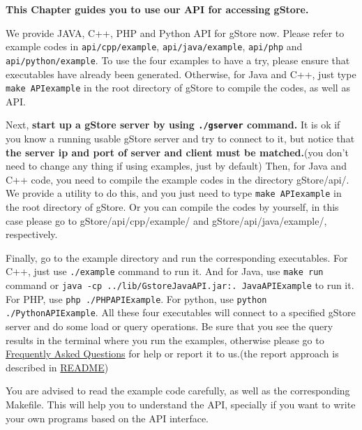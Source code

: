 \documentclass[titlepage, a4paper, 12pt]{article}
\begin{document}
\textbf{This Chapter guides you to use our API for accessing gStore.}


We provide JAVA, C++, PHP and Python API for gStore now. Please refer to example
codes in \texttt{api/cpp/example}, \texttt{api/java/example}, \texttt{api/php} and \texttt{api/python/example}. To use the four examples to have a try, please ensure that executables have already been generated. Otherwise, for Java and C++, just type \texttt{make\ APIexample} in the root directory of gStore to compile the codes, as well as API.

Next, \textbf{start up a gStore server by using \texttt{./gserver}
command.} It is ok if you know a running usable gStore server and try to
connect to it, but notice that \textbf{the server ip and port of server
and client must be matched.}(you don't need to change any thing if using
examples, just by default) Then, for Java and C++ code, you need to compile the example codes
in the directory gStore/api/. We provide a utility to do this, and you
just need to type \texttt{make\ APIexample} in the root directory of
gStore. Or you can compile the codes by yourself, in this case please go
to gStore/api/cpp/example/ and gStore/api/java/example/, respectively.

Finally, go to the example directory and run the corresponding
executables. For C++, just use \texttt{./example} command to run it. And
for Java, use \texttt{make\ run} command or \texttt{java\ -cp\ ../lib/GstoreJavaAPI.jar:.\ JavaAPIExample} to run
it. For PHP, use \texttt{php ./PHPAPIExample}. For python, use \texttt{python ./PythonAPIExample}. All these four executables will connect to a specified gStore server
and do some load or query operations. Be sure that you see the query
results in the terminal where you run the examples, otherwise please go
to \hyperref[chapter10]{Frequently Asked Questions} for help or report
it to us.(the report approach is described in
\hyperref[chapter00]{README})

You are advised to read the example code carefully, as well as the
corresponding Makefile. This will help you to understand the API,
specially if you want to write your own programs based on the API
interface.

\end{document}
